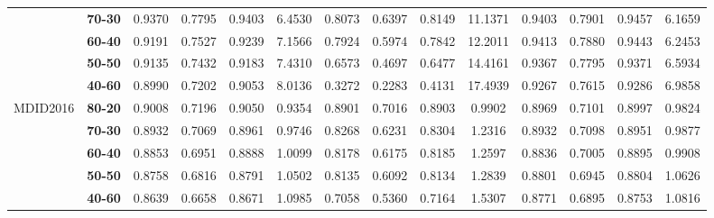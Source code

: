 \begin{sidewaystable}[htb]
\begin{tabular}{m{1.7cm}|c||c|c|c|c||c|c|c|c||c|c|c|c}
             &\textbf{70-30}&0.9370&0.7795&0.9403&6.4530&0.8073&0.6397&0.8149&11.1371&0.9403&0.7901&0.9457&6.1659\\[1ex]
             &\textbf{60-40}&0.9191&0.7527&0.9239&7.1566&0.7924&0.5974&0.7842&12.2011&0.9413&0.7880&0.9443&6.2453\\[1ex]
             &\textbf{50-50}&0.9135&0.7432&0.9183&7.4310&0.6573&0.4697&0.6477&14.4161&0.9367&0.7795&0.9371&6.5934\\[1ex]
             &\textbf{40-60}&0.8990&0.7202&0.9053&8.0136&0.3272&0.2283&0.4131&17.4939&0.9267&0.7615&0.9286&6.9858\\[1ex]
             \hline\hline
             \multirow{5}{4em}{MDID2016}&\textbf{80-20}&0.9008&0.7196&0.9050&0.9354&0.8901&0.7016&0.8903&0.9902&0.8969&0.7101&0.8997&0.9824\\[1ex]
             &\textbf{70-30}&0.8932&0.7069&0.8961&0.9746&0.8268&0.6231&0.8304&1.2316&0.8932&0.7098&0.8951&0.9877\\[1ex]
             &\textbf{60-40}&0.8853&0.6951&0.8888&1.0099&0.8178&0.6175&0.8185&1.2597&0.8836&0.7005&0.8895&0.9908\\[1ex]
             &\textbf{50-50}&0.8758&0.6816&0.8791&1.0502&0.8135&0.6092&0.8134&1.2839&0.8801&0.6945&0.8804&1.0626\\[1ex]
             &\textbf{40-60}&0.8639&0.6658&0.8671&1.0985&0.7058&0.5360&0.7164&1.5307&0.8771&0.6895&0.8753&1.0816\\[1ex]
             \hline\hline
             
             \end{tabular}\hspace*{-1cm}
\end{sidewaystable}

